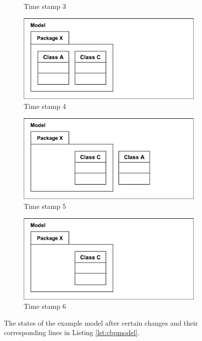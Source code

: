 \documentclass[sigplan,review,anonymous]{acmart}\settopmatter{printfolios=true,printccs=false,printacmref=false}
\begin{document}
\begin{figure}[t]
\begin{subfigure}[t]{0.49\linewidth}
        \caption{Time stamp 3}
        \label{fig:illustration_5}
    \end{subfigure}
    \begin{subfigure}[t]{0.49\linewidth}
        \centering
        \includegraphics[width=\linewidth]{images/illustration_6}
        \caption{Time stamp 4}
        \label{fig:illustration_6}
    \end{subfigure}
    \hfill
    \begin{subfigure}[t]{0.49\linewidth}
        \centering
        \includegraphics[width=\linewidth]{images/illustration_7}
        \caption{Time stamp 5}
        \label{fig:illustration_7}
    \end{subfigure}
    \begin{subfigure}[t]{0.49\linewidth}
        \centering
        \includegraphics[width=\linewidth]{images/illustration_8}
        \caption{Time stamp 6}
        \label{fig:illustration_8}
    \end{subfigure}
    
    \caption{The states of the example model after certain changes and their corresponding lines in Listing \ref{lst:cbpmodel}.}
    \label{fig:illustration_cbp}
\end{figure}
\end{document}
